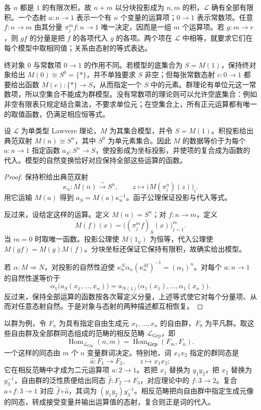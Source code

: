 各 \(n\) 都是 \(1\) 的有限次积，故 \(n+m\) 以分块投影成为 \(n,m\) 的积，\(\mathcal L\) 确有全部有限积。一个态射 \(a:n\to1\) 表示一个有 \(n\) 个变量的运算项；\(0\to1\) 表示常数项。任意 \(f:n\to m\) 由其分量 \(\pi_j^mf:n\to1\) 唯一决定，因而是一组 \(m\) 个运算项。若 \(g:m\to r\)，则 \(gf\) 的分量是把 \(f\) 的各项代入 \(g\) 的各项。两个项在 \(\mathcal L\) 中相等，就要求它们在每个模型中取相同值；关系由态射的等式表达。

\ProseParagraphBreak
终对象 \(0\) 与常数项 \(0\rightarrow1\) 的作用不同。若模型的底集合为 \(S=M(1)\)，保持终对象给出 \(M(0)\cong S^0=\{*\}\)，并不单独要求 \(S\) 非空；但每张常数态射 \(c:0\rightarrow1\) 都要给出函数 \(M(c):\{*\}\rightarrow S\)，从而指定一个 \(S\) 中的元素。群理论有单位元这一常数项，所以空集合不能成为群模型。没有常数项的理论则可以允许空底集合：例如非空有限表只规定结合乘法，不要求单位元；在空集合上，所有正元运算都有唯一的取值函数，仍满足相应恒等式。

\begin{proposition}\label{b4:prop:A-lawvere-model-operations}
	设 \(\mathcal L\) 为单类型 Lawvere 理论，\(M\) 为其集合模型，并令 \(S=M(1)\)。积投影给出典范双射 \(M(n)\cong S^n\)，其中 \(S^0\) 为单元素集合。因此 \(M\) 的数据等价于为每个 \(a:n\to1\) 指定函数 \(a_S:S^n\to S\)，使投影成为坐标投影，并使项的复合成为函数的代入。模型的自然变换恰好对应保持全部这些运算的函数。
\end{proposition}
\begin{proof}
	保持积给出典范双射
	\[
		\kappa_n:M(n)\xrightarrow{\sim}S^n, \qquad z\longmapsto\bigl(M(\pi_i^n)(z)\bigr)_i.
	\]
	用它运输 \(M(a)\) 得到 \(a_S=M(a)\kappa_n^{-1}\)。函子公理保证投影与代入等式。

	反过来，设给定这样的运算。定义 \(M(n)=S^n\)；对 \(f:n\to m\)，定义
	\[
		M(f)(x)=\bigl((\pi_j^mf)_S(x)\bigr)_{j=1}^m.
	\]
	当 \(m=0\) 时取唯一函数。投影公理使 \(M(1_n)\) 为恒等，代入公理使 \(M(gf)=M(g)M(f)\)。分块坐标还保证它保持有限积，故确实给出模型。

	若 \(\alpha:M\Rightarrow N\)，对投影的自然性迫使 \(\kappa_n^N\alpha_n(\kappa_n^M)^{-1}=(\alpha_1)^n\)。对每个 \(a:n\to1\) 的自然性遂等价于
	\[
		\alpha_1\bigl(a_S(x_1,\ldots,x_n)\bigr) =a_{N(1)}\bigl(\alpha_1(x_1),\ldots,\alpha_1(x_n)\bigr).
	\]
	反过来，保持全部运算的函数按各次幂定义分量，上述等式使它对每个分量项、从而对任意态射自然。于是对象与态射的两种描述都互相恢复。
\end{proof}

以群为例，令 \(F_n\) 为具有指定自由生成元 \(x_1,\ldots,x_n\) 的自由群，\(F_0\) 为平凡群。取这些自由群及全部群同态组成的范畴的相反范畴 \(\mathcal L_{\mathrm{Grp}}\)，即
\[
	\operatorname{Hom}_{\mathcal L_{\mathrm{Grp}}}(n,m) =\operatorname{Hom}_{\mathbf{Grp}}(F_m,F_n).
\]
一个这样的同态由 \(m\) 个 \(n\) 变量群词决定。特别地，词 \(x_1x_2\) 指定的群同态是
\[
	\widehat a:F_1\longrightarrow F_2, \qquad z\longmapsto x_1x_2;
\]
它在相反范畴中才成为二元运算项 \(a:2\rightarrow1\)。若把 \(x_1\) 替换为 \(y_1y_2\)，把 \(x_2\) 替换为 \(y_3^{-1}\)，自由群的泛性质便给出同态 \(\widehat f:F_2\rightarrow F_3\)，对应理论中的 \(f:3\rightarrow2\)。复合 \(a\circ f:3\rightarrow1\) 对应 \(\widehat f\circ\widehat a\)，其词为 \((y_1y_2)y_3^{-1}\)。相反范畴把向自由群中指定生成元像的同态，转成接受变量并输出运算值的态射，复合则正是词的代入。

